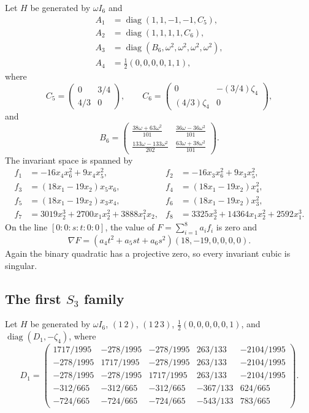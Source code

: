 \documentclass[12pt]{amsart}
\numberwithin{equation}{section}
\theoremstyle{plain}
\theoremstyle{definition}
\theoremstyle{remark}
\DeclareMathOperator{\diag}{diag}
\begin{document}
Let $H$ be generated by $\omega I_6$ and
\begin{align*}
 A_1&=\diag(1,1,-1,-1,C_5),\\
 A_2&=\diag(1,1,1,1,C_6),\\
 A_3&=\diag(B_6,\omega^2,\omega^2,\omega^2,\omega^2),\\
 A_4&=\frac12(0,0,0,0,1,1),
\end{align*}
where
\[
 C_5=\begin{pmatrix}0&3/4\\4/3&0\end{pmatrix},\qquad
 C_6=\begin{pmatrix}0&-(3/4)\zeta _4\\(4/3)\zeta _4&0\end{pmatrix},
\]
and
\[
 B_6=\begin{pmatrix}
 \frac{38\omega+63\omega^2}{101}&
 \frac{36\omega-36\omega^2}{101}\\
 \frac{133\omega-133\omega^2}{202}&
 \frac{63\omega+38\omega^2}{101}
 \end{pmatrix}.
\]
The invariant space is spanned by
\begin{align*}
 f_1&=-16x_4x_6^2+9x_4x_5^2,&
 f_2&=-16x_3x_6^2+9x_3x_5^2,\\
 f_3&=(18x_1-19x_2)x_5x_6,&
 f_4&=(18x_1-19x_2)x_4^2,\\
 f_5&=(18x_1-19x_2)x_3x_4,&
 f_6&=(18x_1-19x_2)x_3^2,\\
 f_7&=3019x_2^3+2700x_1x_2^2+3888x_1^2x_2,&
 f_8&=3325x_2^3+14364x_1x_2^2+2592x_1^3.
\end{align*}
On the line $[0:0:s:t:0:0]$, the value of
$F=\sum_{i=1}^8a_if_i$ is zero and
\[
 \nabla F=(a_4t^2+a_5st+a_6s^2)(18,-19,0,0,0,0).
\]
Again the binary quadratic has a projective zero, so every invariant cubic
is singular.

\subsection{The first $S_3$ family}

Let $H$ be generated by $\omega I_6$, $(1\,2)$, $(1\,2\,3)$,
$\frac12(0,0,0,0,0,1)$, and $\diag(D_1,-\zeta _4)$, where
\[
 D_1=\begin{pmatrix}
 1717/1995&-278/1995&-278/1995&263/133&-2104/1995\\
 -278/1995&1717/1995&-278/1995&263/133&-2104/1995\\
 -278/1995&-278/1995&1717/1995&263/133&-2104/1995\\
 -312/665&-312/665&-312/665&-367/133&624/665\\
 -724/665&-724/665&-724/665&-543/133&783/665
 \end{pmatrix}.
\]
\end{document}
